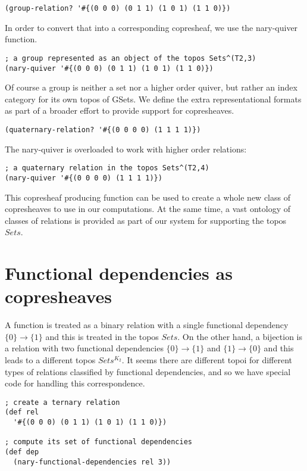 \documentclass[a4paper,11pt]{report}
\begin{document}
\begin{lstlisting}
(group-relation? '#{(0 0 0) (0 1 1) (1 0 1) (1 1 0)}) 
\end{lstlisting}

In order to convert that into a corresponding copresheaf, we use the nary-quiver function.

\begin{lstlisting}
; a group represented as an object of the topos Sets^(T2,3)
(nary-quiver '#{(0 0 0) (0 1 1) (1 0 1) (1 1 0)})
\end{lstlisting}

Of course a group is neither a set nor a higher order quiver, but rather an index category for its own topos of GSets. We define the extra representational formats as part of a broader effort to provide support for copresheaves.

\begin{lstlisting}
(quaternary-relation? '#{(0 0 0 0) (1 1 1 1)})
\end{lstlisting}

The nary-quiver is overloaded to work with higher order relations:

\begin{lstlisting}
; a quaternary relation in the topos Sets^(T2,4)
(nary-quiver '#{(0 0 0 0) (1 1 1 1)})
\end{lstlisting}

This copresheaf producing function can be used to create a whole new class of copresheaves to use in our computations. At the same time, a vast ontology of classes of relations is provided as part of our system for supporting the topos $Sets$.

\newpage 

\section{Functional dependencies as copresheaves}
A function is treated as a binary relation with a single functional dependency $\{0\} \to \{1\}$ and this is treated in the topos $Sets$. On the other hand, a bijection is a relation with two functional dependencies $\{0\} \to \{1\}$ and $\{1\} \to \{0\}$ and this leads to a different topos $Sets^{K_2}$. It seems there are different topoi for different types of relations classified by functional dependencies, and so we have special code for handling this correspondence.

\begin{lstlisting}
; create a ternary relation
(def rel 
  '#{(0 0 0) (0 1 1) (1 0 1) (1 1 0)})
  
; compute its set of functional dependencies
(def dep 
  (nary-functional-dependencies rel 3))
\end{lstlisting}
\end{document}

